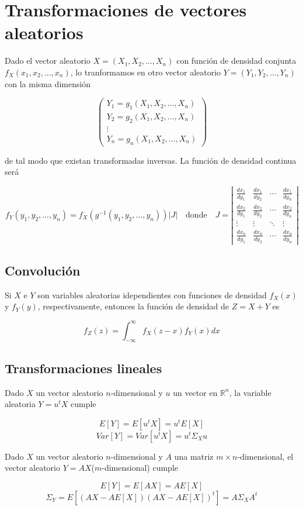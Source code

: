 \section{Transformaciones de vectores aleatorios}


Dado el vector aleatorio $X = (X_1, X_2, \dots, X_n)$ con función de densidad conjunta $f_X(x_1, x_2, \dots, x_n)$, lo tranformamos
en otro vector aleatorio $Y = (Y_1, Y_2, \dots, Y_n)$ con la misma dimensión

\[ \left( \begin{matrix}
    Y_1 = g_1(X_1,X_2,\dots,X_n) \\
    Y_2 = g_2(X_1,X_2,\dots,X_n) \\
    \vdots \\
    Y_n = g_n(X_1,X_2,\dots,X_n)
\end{matrix} \right) \]

de tal modo que existan transformadas inversas. La función de densidad continua será

\[ f_Y(y_1, y_2, \dots, y_n) = f_X(g^{-1}(y_1, y_2, \dots, y_n))|J| \quad \text{donde} \quad J = 
\left| \begin{matrix}
    \frac{dx_1}{dy_1} & \frac{dx_1}{dy_2} & \cdots & \frac{dx_1}{dy_n} \\
    \frac{dx_2}{dy_1} & \frac{dx_2}{dy_2} & \cdots & \frac{dx_2}{dy_n} \\
    \vdots & \vdots & \ddots & \vdots \\
    \frac{dx_n}{dy_1} & \frac{dx_n}{dy_2} & \cdots & \frac{dx_n}{dy_n}
\end{matrix} \right| \]


\newpage

\subsection{Convolución}

Si $X$ e $Y$ son variables aleatorias idependientes con funciones de densidad $f_X(x)$ y $f_Y(y)$, respectivamente, entonces la función de densidad de 
$Z = X + Y$ es

\[ f_Z(z) = \int_{-\infty}^{\infty}f_{X}(z - x)f_{Y}(x)dx \]

\subsection{Transformaciones lineales}

Dado $X$ un vector aleatorio $n$-dimensional y $u$ un vector en $\mathbb{R}^n$, la variable aleatoria $Y = u^tX$ cumple

\[ E[Y] = E[u^tX] = u^tE[X] \]
\[ Var[Y] = Var[u^tX] = u^t\Sigma_Xu \]

Dado $X$ un vector aleatorio $n$-dimensional y $A$ una matriz $m \times n$-dimensional, el vector aleatorio $Y = AX$($m$-dimensional) cumple

\[ E[Y] = E[AX] = AE[X] \]
\[ \Sigma_Y = E[(AX - AE[X])(AX - AE[X])^t] = A\Sigma_XA^t \]

\newpage
